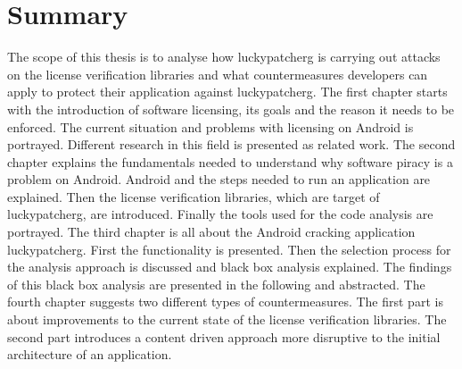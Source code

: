 \section{Summary}\label{section:conclusion-summary}
The scope of this thesis is to analyse how \gls{luckypatcherg} is carrying out  attacks on the license verification libraries and what countermeasures developers can apply to protect their application against \gls{luckypatcherg}.
\newline
\newline
The first chapter starts with the introduction of software licensing, its goals and the reason it needs to be enforced.
The current situation and problems with licensing on Android is portrayed.
Different research in this field is presented as related work.
\newline
\newline
The second chapter explains the fundamentals needed to understand why software piracy is a problem on Android.
Android and the steps needed to run an application are explained.
Then the license verification libraries, which are target of \gls{luckypatcherg}, are introduced.
Finally the tools used for the code analysis are portrayed.
\newline
\newline
The third chapter is all about the Android cracking application \gls{luckypatcherg}.
First the functionality is presented.
Then the selection process for the analysis approach is discussed and black box analysis explained.
The findings of this black box analysis are presented in the following and abstracted.
\newline
\newline
The fourth chapter suggests two different types of countermeasures.
The first part is about improvements to the current state of the license verification libraries.
The second part introduces a content driven approach more disruptive to the initial architecture of an application.
